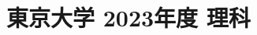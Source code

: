 ﻿\documentclass[../../uem_mat_tok_q.tex]{subfiles}
\begin{document}
    \section{東京大学 2023年度 理科}
    \subsection{　}
    
    \vfill
    \subsection{　}
    
    \vfill
    \newpage
    \subsection{　}
    
    \vfill
    \subsection{　}
    
    \vfill
    \newpage
    \subsection{　}
    
    \vfill
    \subsection{　}
    
    \vfill
\end{document}
